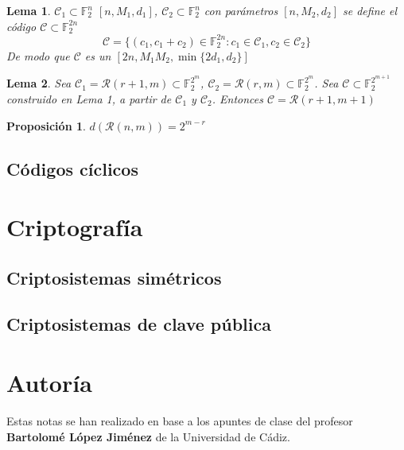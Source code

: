 \documentclass[spanish]{book}
\newtheorem{proposi}{Proposición}
\newtheorem{lema}{Lema}
\begin{document}
\begin{lema}
	$\mathcal{C}_1 \subset \mathbb{F}_2^n$ $[n, M_1, d_1]$, $\mathcal{C}_2 \subset \mathbb{F}_2^n$ con parámetros $[n, M_2, d_2]$ se define el código $\mathcal{C} \subset \mathbb{F}_2^{2n}$
	$$ \mathcal{C}= \{(c_1, c_1+c_2) \in \mathbb{F}^{2n}_2 : c_1 \in \mathcal{C}_1, c_2 \in \mathcal{C}_2 \}$$
	De modo que $\mathcal{C}$ es un $[2n, M_1 M_2, \min\{2d_1, d_2\}]$
\end{lema}

\begin{lema}
	Sea $\mathcal{C}_1=\mathcal{R}(r+1, m) \subset \mathbb{F}_2^{2^m}$, $\mathcal{C}_2=\mathcal{R}(r, m) \subset \mathbb{F}_2^{2^m}$. Sea $\mathcal{C} \subset \mathbb{F}_2^{2^{m+1}}$ construido en Lema 1, a partir de $\mathcal{C}_1$ y $\mathcal{C}_2$. Entonces $\mathcal{C}=\mathcal{R}(r+1, m+1)$
\end{lema}


\begin{proposi}
	$d(\mathcal{R}(n,m))=2^{m-r}$
\end{proposi}
\section{Códigos cíclicos}

\chapter{Criptografía}
\section{Criptosistemas simétricos}
\section{Criptosistemas de clave pública}

\chapter*{Autoría}
Estas notas se han realizado en base a los apuntes de clase del profesor \textbf{Bartolomé López Jiménez} de la Universidad de Cádiz.
\end{document}
